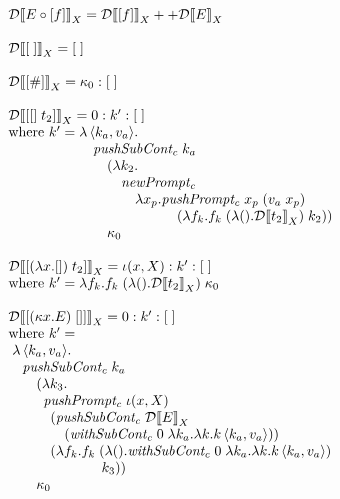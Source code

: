 \documentclass{LMCS}
\newenvironment{boxedarray}[1]
  {\begin{lrbox}{\saveboxedarray}\begin{math}\begin{array}{#1}}
  {\end{array}\end{math}\end{lrbox}\fbox{\usebox{\saveboxedarray}}}
\theoremstyle{plain}
\theoremstyle{remark}
\renewcommand{\comp}[0]{\ensuremath{\circ}}
\begin{document}
\begin{figure}[ht]
  \centering\small
  \begin{boxedarray}{@{}l@{}}

    \mathcal{D}|[ E \comp [f] |]_X  =
    \mathcal{D}|[[f]|]_X ++ \mathcal{D}|[E|]_X  \\ \\

    \mathcal{D}|[ [\;] |]_X  =  [\;]  \\ \\

    \mathcal{D}|[ [\#] |]_X  =  \kappa_0:[\;]  \\ \\

    \mathcal{D}|[ [[]\; t_2] |]_X  =   0 : k' : [\;]  \\
        \text{where } k' = 
      \begin{array}[t]{@{}l@{}}
\lambda\Braket{k_a,v_a}\!. \\
\quad\mathit{pushSubCont_c}\; k_a \\
\qquad(\lambda k_2. \\
\qquad\quad\mathit{newPrompt_c} \\
\qquad\qquad\lambda x_p.\mathit{pushPrompt_c}\; x_p\; (v_a\; x_p)  \\
\qquad\qquad\qquad\quad(\lambda f_k.f_k\; (\lambda (). \mathcal{D}|[ t_2 |]_X)\; k_2)) \\
\qquad \kappa_0
      \end{array}  \\ \\ 

      \mathcal{D}|[ [(\lambda x.[])\; t_2] |]_X  =  \iota(x,X) : k' : [\;]  \\
        \text{where } k' = 
      \lambda f_k.f_k\; (\lambda (). \mathcal{D}|[ t_2 |]_X)\; \kappa_0 \\ \\



      \mathcal{D}|[ [(\kappa x.E)\;[]] |]_X  =   0 : k' : [\;]  \\
        \text{where } k' = \\
      \begin{array}[t]{@{}l@{}}
\;\lambda \Braket{k_a,v_a}\!.\\
\quad \mathit{pushSubCont_c}\; k_a \\
\qquad(\lambda k_3.\\
\qquad\;\:\mathit{pushPrompt_c}\; \iota(x,X) \\
\qquad\quad(\mathit{pushSubCont_c}\; \mathcal{D}|[E|]_X \\
\qquad\qquad(\mathit{withSubCont_c}\; 0\; 
\lambda k_a. \lambda k. k \Braket{k_a, v_a})) \\
\qquad\quad(\lambda f_k.f_k\;
 (\lambda ().\mathit{withSubCont_c}\; 0\;
\lambda k_a.\lambda k. k \Braket{k_a, v_a}) \\
\qquad\quad\qquad\qquad\!\!k_3)) \\
\qquad \kappa_0
      \end{array}


\end{boxedarray}
\end{figure}
\end{document}
